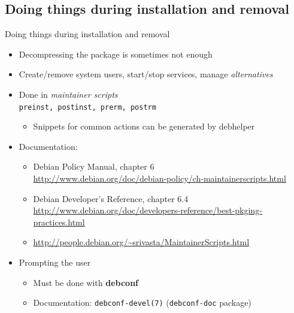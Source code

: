 \documentclass[10pt,final]{beamer}
\begin{document}
\subsection{Doing things during installation and removal}
\begin{frame}{Doing things during installation and removal}
  \begin{itemize}
  \item Decompressing the package is sometimes not enough
    \hbr
  \item Create/remove system users, start/stop services, manage \textsl{alternatives}
    \hbr
  \item Done in \textsl{maintainer scripts}\\
    \texttt{preinst, postinst, prerm, postrm}
    \begin{itemize}
	    \item  Snippets for common actions can be generated by debhelper
    \end{itemize}
    \hbr
  \item Documentation:
    \begin{itemize}
    \item Debian Policy Manual, chapter 6\\
      {\footnotesize \url{http://www.debian.org/doc/debian-policy/ch-maintainerscripts.html}}
      
      \hbr
    \item Debian Developer's Reference, chapter 6.4\\
      {\scriptsize \url{http://www.debian.org/doc/developers-reference/best-pkging-practices.html}}
      \hbr
    \item {\footnotesize \url{http://people.debian.org/~srivasta/MaintainerScripts.html}}
    \end{itemize}
    \br
  \item Prompting the user
    \begin{itemize}
    \item Must be done with \textbf{debconf}
      \hbr
    \item Documentation: \texttt{debconf-devel(7)} (\texttt{debconf-doc} package)
    \end{itemize}
  \end{itemize}
\end{frame}
\end{document}
